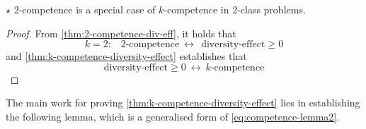 \documentclass[../main.tex]{subfiles}
\begin{document}
\begin{theorem} $\star$ $2$-competence is a special case of $k$-competence in $2$-class problems.
\end{theorem}
\begin{proof}
From \cref{thm:2-competence-div-eff}, it holds that
$$
k= 2\text{:}  \hspace{1em} 2\text{-competence} ~\leftrightarrow~ ~ \text{diversity-effect}  \geq 0
$$
and \cref{thm:k-competence-diversity-effect} establishes that
$$
\text{diversity-effect} \geq 0 ~\leftrightarrow~ k\text{-competence} 
$$
\end{proof}

The main work for proving \cref{thm:k-competence-diversity-effect} lies in establishing the following lemma, which is a generalised form of \cref{eq:competence-lemma2}. 
\end{document}
